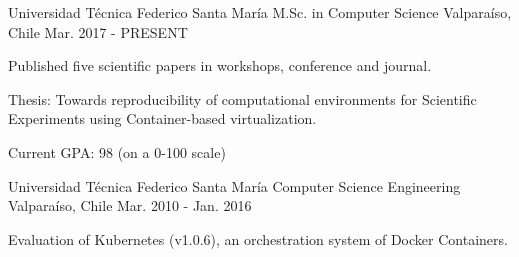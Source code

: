 \begin{cventries}
  \cventry
    {Universidad Técnica Federico Santa María}
        {M.Sc. in Computer Science}
    {Valparaíso, Chile}
    {Mar. 2017 - PRESENT}
    {
      \begin{cvitems}
        \item {Published five scientific papers in workshops, conference and journal.}
        \item{Thesis: Towards reproducibility of computational environments for Scientific Experiments using Container-based virtualization.}
        \item{Current GPA: 98 (on a 0-100 scale)}
      \end{cvitems}
    }
    
  \cventry
      {Universidad Técnica Federico Santa María}
    {Computer Science Engineering}
    {Valparaíso, Chile}
    {Mar. 2010 - Jan. 2016}
    {
      \begin{cvitems}
        \item {Evaluation of Kubernetes (v1.0.6), an orchestration system of Docker Containers.}
        \end{cvitems}
    }
\end{cventries}
